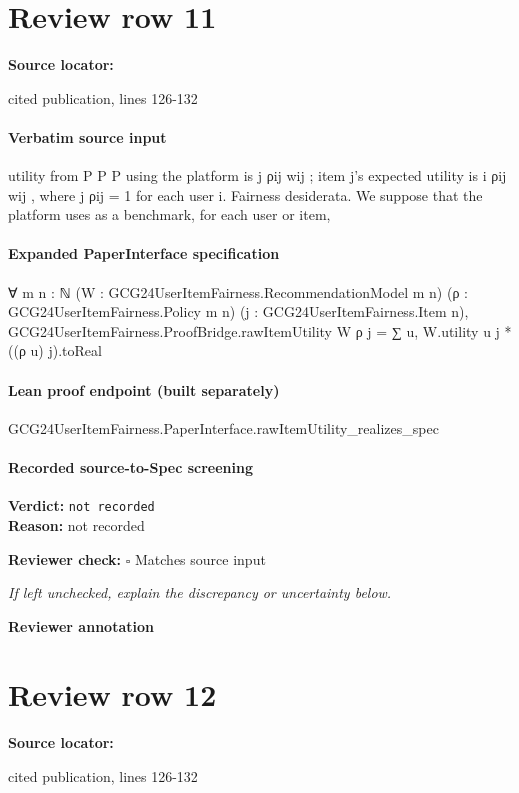 \documentclass[10pt]{article}
\newcommand{\reviewerbox}{%
  \par\noindent\fbox{\parbox{0.96\linewidth}{\rule{0pt}{0.38in}}}\par
}
\newcommand{\reviewmatch}[1]{%
  \par\noindent\textbf{Reviewer check:} $\square$\; #1\par
  \noindent\emph{If left unchecked, explain the discrepancy or uncertainty below.}\par
}
\begin{document}
\section*{Review row 11}
\textbf{Source locator:} {\footnotesize\raggedright cited publication, lines 126-\allowbreak{}132\par}
\paragraph{Verbatim source input}
\begin{ReviewVerbatim}
utility from
P
P
P
using the platform is j ρij wij ; item j’s expected utility is i ρij wij , where j ρij = 1 for each
user i.
Fairness desiderata. We suppose that the platform uses as a benchmark, for each user or item,
\end{ReviewVerbatim}


\paragraph{Expanded PaperInterface specification}
\begin{ReviewVerbatim}
∀ {m n : ℕ} (W : GCG24UserItemFairness.RecommendationModel m n) (ρ : GCG24UserItemFairness.Policy m n)
  (j : GCG24UserItemFairness.Item n),
  GCG24UserItemFairness.ProofBridge.rawItemUtility W ρ j = ∑ u, W.utility u j * ((ρ u) j).toReal
\end{ReviewVerbatim}

\paragraph{Lean proof endpoint (built separately)}\begin{ReviewVerbatim}
GCG24UserItemFairness.PaperInterface.rawItemUtility_realizes_spec
\end{ReviewVerbatim}

\paragraph{Recorded source-to-Spec screening}
\textbf{Verdict:} \texttt{not recorded}
\\
\textbf{Reason:} not recorded
\reviewmatch{Matches source input}
\noindent\textbf{Reviewer annotation}\par
\reviewerbox
\clearpage
\hypertarget{source-claim-9ef94f4afd2b61ac}{}
\section*{Review row 12}
\textbf{Source locator:} {\footnotesize\raggedright cited publication, lines 126-\allowbreak{}132\par}
\end{document}

